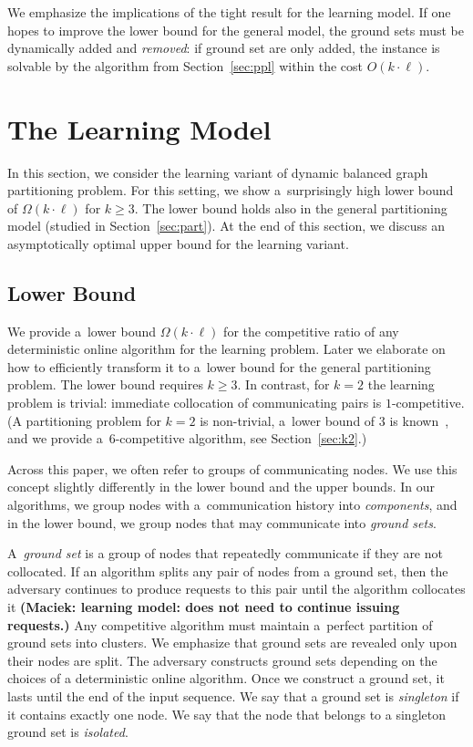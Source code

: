 \documentclass[a4paper,anonymous,USenglish]{lipics-v2019}
\newcommand\maciek[1]{\color{brown}\textbf{(Maciek: #1)}\color{black}}
\begin{document}
We emphasize the implications of the tight result for the learning model.
If one hopes to improve the lower bound for the general model, the ground sets must be dynamically added and \emph{removed}: if ground set are only added, the instance is solvable by the algorithm from Section~\ref{sec:ppl} within the cost $O(k\cdot \ell)$.

\section{The Learning Model} %

In this section, we consider the learning variant of dynamic balanced graph partitioning problem.
For this setting, we show a~surprisingly high lower bound of $\Omega(k \cdot \ell)$ for $k\geq 3$.
The lower bound holds also in the general partitioning model (studied in Section~\ref{sec:part}).
At the end of this section, we discuss an asymptotically optimal upper bound for the learning variant.


\subsection{Lower Bound}

\label{sec:lowerbound}


We provide a~lower bound $\Omega(k\cdot \ell)$ for the competitive ratio of any deterministic online algorithm for the learning problem.
Later we elaborate on how to efficiently transform it to a~lower bound for the general partitioning problem.
The lower bound requires $k\geq 3$.
In contrast, for $k=2$ the learning problem is trivial: immediate collocation of communicating pairs is $1$-competitive.
(A partitioning problem for $k=2$ is non-trivial, a~lower bound of $3$ is known~\cite{repartition-disc}, and we provide a~$6$-competitive algorithm, see Section~\ref{sec:k2}.)

Across this paper, we often refer to groups of communicating nodes.
We use this concept slightly differently in the lower bound and the upper bounds.
In our algorithms, we group nodes with a~communication history into \emph{components}, and in the lower bound, we group nodes that may communicate into \emph{ground sets}.



A~\emph{ground set} is a group of nodes that repeatedly communicate if they are not collocated.
If an algorithm splits any pair of nodes from a ground set, then the adversary continues to produce requests to this pair until the algorithm collocates it \maciek{learning model: does not need to continue issuing requests.}
Any competitive algorithm must maintain a~perfect partition of ground sets into clusters.
We emphasize that ground sets are revealed only upon their nodes are split.
The adversary constructs ground sets depending on the choices of a deterministic online algorithm.
Once we construct a ground set, it lasts until the end of the input sequence.
We say that a ground set is \emph{singleton} if it contains exactly one node.
We say that the node that belongs to a singleton ground set is \emph{isolated}.
\end{document}
